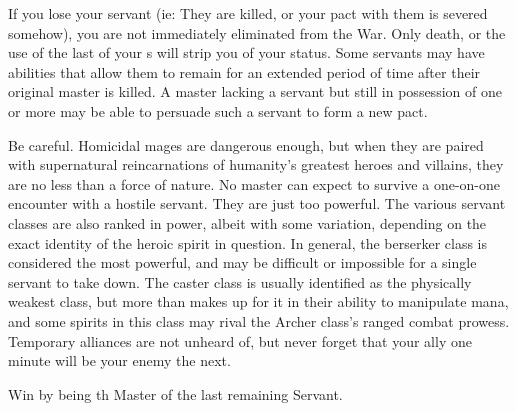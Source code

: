\documentclass[blue]{FateDarkDawn}
\begin{document}
If you lose your servant (ie: They are killed, or your pact with them is severed somehow), you are not immediately eliminated from the War. Only death, or the use of the last of your \iCommand{\MYname}s will strip you of your status. Some servants may have abilities that allow them to remain for an extended period of time after their original master is killed. A master lacking a servant but still in possession of one or more \iCommand{\MYname} may be able to persuade such a servant to form a new pact.

Be careful. Homicidal mages are dangerous enough, but when they are paired with supernatural reincarnations of humanity's greatest heroes and villains, they are no less than a force of nature. No master can expect to survive a one-on-one encounter with a hostile servant. They are just too powerful. The various servant classes are also ranked in power, albeit with some variation, depending on the exact identity of the heroic spirit in question. In general, the berserker class is considered the most powerful, and may be difficult or impossible for a single servant to take down. The caster class is usually identified as the physically weakest class, but more than makes up for it in their ability to manipulate mana, and some spirits in this class may rival the Archer class's ranged combat prowess. Temporary alliances are not unheard of, but never forget that your ally one minute will be your enemy the next.

\begin{itemz}[Goals]
	\item Win \iGrail{} by being th Master of the last remaining Servant.
\end{itemz}
\end{document}

